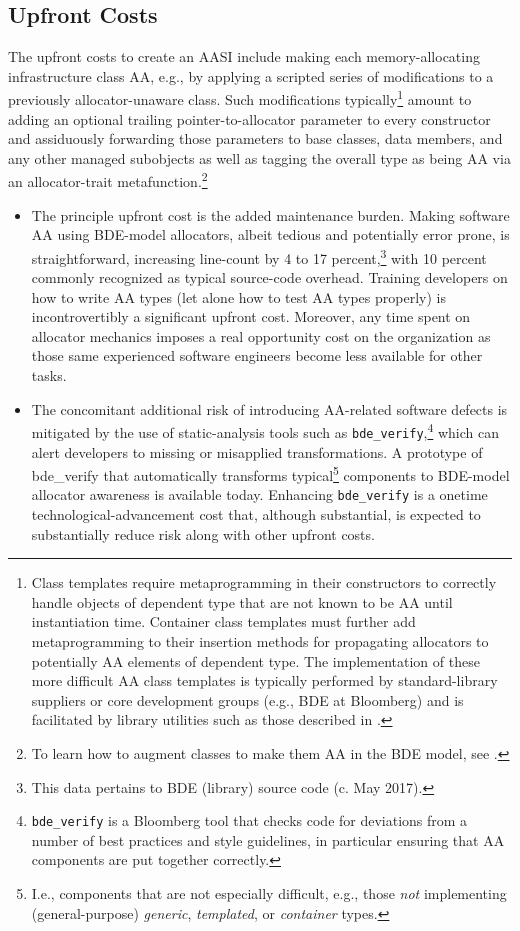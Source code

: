 \subsection{Upfront Costs}
The upfront costs to create an AASI include making each memory-allocating
infrastructure class AA, e.g., by applying a scripted series of modifications to a
previously allocator-unaware class. Such modifications typically\footnote{Class templates require metaprogramming in their constructors to correctly handle objects of
dependent type that are not known to be AA until instantiation time. Container class templates must
further add metaprogramming to their insertion methods for propagating allocators to potentially AA
elements of dependent type. The implementation of these more difficult AA class templates is typically
performed by standard-library suppliers or core development groups (e.g., BDE at Bloomberg) and is
facilitated by library utilities such as those described in \cite{halpern18}.} amount to adding
an optional trailing pointer-to-allocator parameter to every constructor and
assiduously forwarding those parameters to base classes, data members, and any
other managed subobjects as well as tagging the overall type as being AA via an
allocator-trait metafunction.\footnote{To learn how to augment classes to make them AA in the BDE model, see \cite{halpern20b}.}

\begin{itemize}

\item The principle upfront cost is the added maintenance burden. Making software
AA using BDE-model allocators, albeit tedious and potentially error prone, is
straightforward, increasing line-count by 4 to 17 percent,\footnote{This
data pertains to BDE (library) source code (c. May 2017). } with 10 percent
commonly recognized as typical source-code overhead. Training developers on
how to write AA types (let alone how to test AA types properly) is
incontrovertibly a significant upfront cost. Moreover, any time spent on
allocator mechanics imposes a real opportunity cost on the organization as
those same experienced software engineers become less available for other
tasks.

\item The concomitant additional risk of introducing AA-related software defects is
mitigated by the use of static-analysis tools such as \lstinline{bde_verify},\footnote{\lstinline{bde_verify} is a
Bloomberg tool that checks code for deviations from a number of best practices
and style guidelines, in particular ensuring that AA components are put together
correctly.} which can
alert developers to missing or misapplied transformations. A prototype of
bde_verify that automatically transforms typical\footnote{I.e., components that
are not especially difficult, e.g., those \emph{not} implementing (general-purpose)
\emph{generic}, \emph{templated}, or \emph{container} types.} components to BDE-model 
allocator awareness is available today. Enhancing \lstinline{bde_verify} is a onetime
technological-advancement cost that, although substantial, is expected
to substantially reduce risk along with other upfront costs.

\end{itemize}

